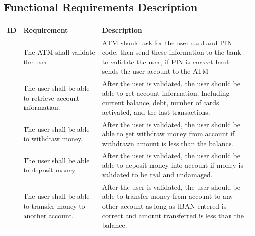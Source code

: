 \documentclass{article}
\newcounter{magicrownumbers}
\newcommand\rownumber{\stepcounter{magicrownumbers}\arabic{magicrownumbers}}
\begin{document}
	\newpage\subsection{Functional Requirements Description}
	\setcounter{magicrownumbers}{0}
	\def\arraystretch{2}
	\begin{table}[h!]
		\begin{center}
			\begin{tabularx}{\textwidth}{r|X|X}
				\textbf{ID} & 
				\textbf{Requirement} & 
				\textbf{Description}\\
				\hline
				\rownumber &
				The ATM shall validate the user. &
				ATM should ask for the user card and PIN code, then send these information to the bank to validate the user, if PIN is correct bank sends the user account to the ATM
				\\
				\hline

				\rownumber &
				The user shall be able to retrieve account information. &
				After the user is validated, the user should be able to get account information. Including current balance, debt, number of cards activated, and the last transactions.
				\\
				\hline
				\rownumber &
				The user shall be able to withdraw money. &
				After the user is validated, the user should be able to get withdraw money from account if withdrawn amount is less than the balance.
				\\
				\hline
				\rownumber &
				The user shall be able to deposit money. &
				After the user is validated, the user should be able to deposit money into account if money is validated to be real and undamaged.
				\\
				\hline
				\rownumber &
				The user shall be able to transfer money to another account. &
				After the user is validated, the user should be able to transfer money from account to any other account as long as IBAN entered is correct and amount transferred is less than the balance.
				\\	
			\end{tabularx}
		\end{center}
	\end{table}
\end{document}
